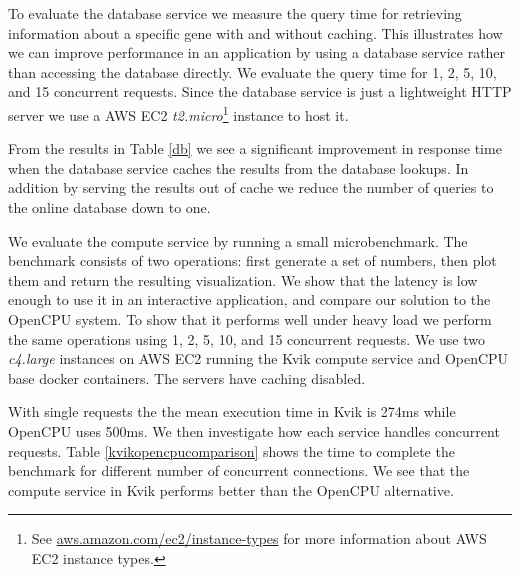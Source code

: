 To evaluate the database service we measure the query time for retrieving
information about a specific gene with and without caching. This illustrates how
we can improve performance in an application by using a database service rather
than accessing the database directly.  We evaluate the query time for 1, 2, 5,
10, and 15 concurrent requests. Since the database service is just a lightweight
HTTP server we use a AWS EC2 \emph{t2.micro}\footnote{See
\url{aws.amazon.com/ec2/instance-types} for more information about AWS EC2
instance types.} instance to host it.

From the results in Table \ref{db} we see a significant improvement in response
time when the database service caches the results from the database lookups. In
addition by serving the results out of cache we reduce the number of queries to
the online database down to one. 


\begin{table}[h]
    \caption[]{Time to retrieve a gene summary for a single gene, comparing
    different number of concurrent requests.}
\label{db}
\end{table} 


We evaluate the compute service by running a small microbenchmark. The benchmark
consists of two operations: first generate a set of numbers, then plot them and
return the resulting visualization. We show that the latency is low enough to
use it in an interactive application, and compare our solution to the OpenCPU
system. To show that it performs well under heavy load
we perform the same operations using 1, 2, 5, 10, and 15 concurrent requests.
We use two \emph{c4.large} instances on AWS EC2 running the Kvik
compute service and OpenCPU base docker containers. The servers have caching
disabled. 

With single requests the the mean execution time in Kvik is 274ms while OpenCPU
uses 500ms. We then investigate how each service handles concurrent requests.
Table \ref{kvikopencpucomparison} shows the time to complete the benchmark for
different number of concurrent connections. We see that the compute service in
Kvik performs better than the OpenCPU alternative. 


